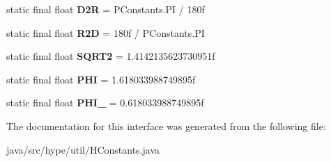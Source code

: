 \begin{DoxyCompactItemize}
\item 
\hypertarget{interfacehype_1_1util_1_1_h_constants_a5ed71fb4b47e5babb0bba63b4bb0c5fa}{static final float {\bfseries D2\-R} = P\-Constants.\-P\-I / 180f}\label{interfacehype_1_1util_1_1_h_constants_a5ed71fb4b47e5babb0bba63b4bb0c5fa}

\item 
\hypertarget{interfacehype_1_1util_1_1_h_constants_a7ce3b8de220fac7fcd9c35758912dc90}{static final float {\bfseries R2\-D} = 180f / P\-Constants.\-P\-I}\label{interfacehype_1_1util_1_1_h_constants_a7ce3b8de220fac7fcd9c35758912dc90}

\item 
\hypertarget{interfacehype_1_1util_1_1_h_constants_a6dd14b2b18bcb7b28751d7df61b3297b}{static final float {\bfseries S\-Q\-R\-T2} = 1.\-4142135623730951f}\label{interfacehype_1_1util_1_1_h_constants_a6dd14b2b18bcb7b28751d7df61b3297b}

\item 
\hypertarget{interfacehype_1_1util_1_1_h_constants_ae09a355ec56553ad5f3fe11fa67c49ed}{static final float {\bfseries P\-H\-I} = 1.\-618033988749895f}\label{interfacehype_1_1util_1_1_h_constants_ae09a355ec56553ad5f3fe11fa67c49ed}

\item 
\hypertarget{interfacehype_1_1util_1_1_h_constants_a1d71bbb29142357c1db975fe388751a8}{static final float {\bfseries P\-H\-I\-\_} = 0.\-618033988749895f}\label{interfacehype_1_1util_1_1_h_constants_a1d71bbb29142357c1db975fe388751a8}

\end{DoxyCompactItemize}


The documentation for this interface was generated from the following file\-:\begin{DoxyCompactItemize}
\item 
java/src/hype/util/H\-Constants.\-java\end{DoxyCompactItemize}
